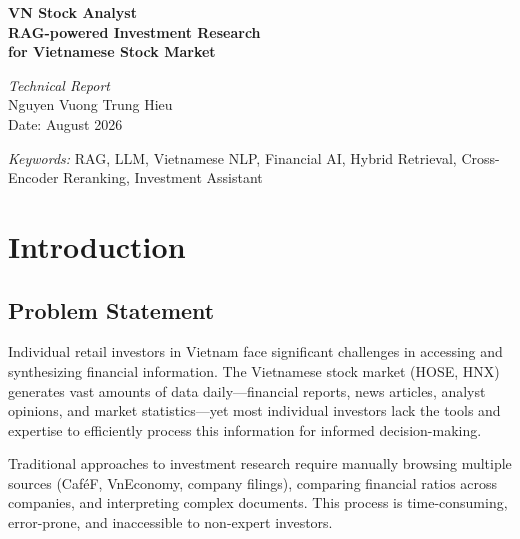 \documentclass[12pt,a4paper]{article}
\begin{document}
\begin{titlepage}
\centering
\vspace*{2cm}

{\Huge\bfseries VN Stock Analyst\\[0.3cm]}
{\LARGE\bfseries RAG-powered Investment Research\\for Vietnamese Stock Market\\[1.5cm]}

{\large\textit{Technical Report}\\[0.5cm]}
{\large Nguyen Vuong Trung Hieu\\[0.3cm]}
{\large Date: August 2026\\[2cm]}



{\small\textit{Keywords:} RAG, LLM, Vietnamese NLP, Financial AI, Hybrid Retrieval,
Cross-Encoder Reranking, Investment Assistant}
\end{titlepage}

\tableofcontents
\newpage

\section{Introduction}
\label{sec:introduction}

\subsection{Problem Statement}

Individual retail investors in Vietnam face significant challenges in accessing
and synthesizing financial information. The Vietnamese stock market (HOSE, HNX)
generates vast amounts of data daily---financial reports, news articles,
analyst opinions, and market statistics---yet most individual investors lack
the tools and expertise to efficiently process this information for informed
decision-making.

Traditional approaches to investment research require manually browsing
multiple sources (CaféF, VnEconomy, company filings), comparing financial
ratios across companies, and interpreting complex documents. This process is
time-consuming, error-prone, and inaccessible to non-expert investors.
\end{document}
